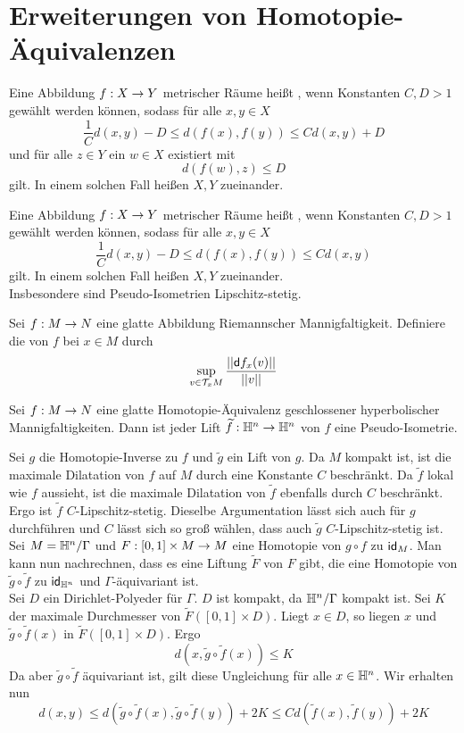 \documentclass{book}
\renewcommand{\d}{\textsf{d}}
\begin{document}
\section{Erweiterungen von Homotopie-Äquivalenzen}
\Def{}
Eine Abbildung $f : X \overset{}{\rightarrow} Y$ metrischer Räume heißt , wenn Konstanten $C,D > 1$ gewählt werden können, sodass für alle $x,y \in X$
\[ \frac{1}{C}d(x,y) - D \leq d(f(x),f(y)) \leq C d(x,y) + D \]
und für alle $z \in Y$ ein $w \in X$ existiert mit
\[ d(f(w),z) \leq D \]
gilt. In einem solchen Fall heißen $X,Y$  zueinander.

\Def{}
Eine Abbildung $f : X \overset{}{\rightarrow} Y$ metrischer Räume heißt , wenn Konstanten $C,D > 1$ gewählt werden können, sodass für alle $x,y \in X$
\[ \frac{1}{C}d(x,y) - D \leq d(f(x),f(y)) \leq C d(x,y) \]
gilt. In einem solchen Fall heißen $X,Y$  zueinander.\\
Insbesondere sind Pseudo-Isometrien Lipschitz-stetig.

\Def{}
Sei $f : M \overset{}{\rightarrow} N$ eine glatte Abbildung Riemannscher Mannigfaltigkeit. Definiere die  von $f$ bei $x\in M$ durch
\[ \sup_{v \in \T_xM} \frac{\norm{\d f_x(v)}}{\norm{v}}  \]

\Prop{}
Sei $f : M \overset{}{\rightarrow} N$ eine glatte Homotopie-Äquivalenz geschlossener hyperbolischer Mannigfaltigkeiten. Dann ist jeder Lift $\widetilde{f} : \mathbb{H}^n \overset{}{\rightarrow} \mathbb{H}^n$ von $f$ eine Pseudo-Isometrie.
\begin{Beweis}{}
	Sei $g$ die Homotopie-Inverse zu $f$ und $\widetilde{g}$ ein Lift von $g$. Da $M$ kompakt ist, ist die maximale Dilatation von $f$ auf $M$ durch eine Konstante $C$ beschränkt. Da $\widetilde{f}$ lokal wie $f$ aussieht, ist die maximale Dilatation von $\widetilde{f}$ ebenfalls durch $C$ beschränkt. Ergo ist $\widetilde{f}$ $C$-Lipschitz-stetig. Dieselbe Argumentation lässt sich auch für $g$ durchführen und $C$ lässt sich so groß wählen, dass auch $\widetilde{g}$ $C$-Lipschitz-stetig ist.\\
	Sei $M = \mathbb{H}^n / \Gamma$ und $F : [0,1] \times M \overset{}{\rightarrow} M$ eine Homotopie von $g\circ f $ zu $\textsf{id}_{M}$. Man kann nun nachrechnen, dass es eine Liftung $\widetilde{F}$ von $F$ gibt, die eine Homotopie von $\widetilde{g} \circ \widetilde{f}$ zu $\textsf{id}_{\mathbb{H}^n}$ und $\Gamma$-äquivariant ist.\\
	Sei $D$ ein Dirichlet-Polyeder für $\Gamma$. $D$ ist kompakt, da $\mathbb{H}^n / \Gamma$ kompakt ist. Sei $K$ der maximale Durchmesser von $\widetilde{F}([0,1]\times D)$. Liegt $x \in D$, so liegen $x$ und $\widetilde{g} \circ \widetilde{f}(x)$ in $\widetilde{F}([0,1]\times D)$. Ergo
	\[ d(x, \widetilde{g} \circ \widetilde{f} (x)) \leq K \]
	Da aber $\widetilde{g} \circ \widetilde{f}$ äquivariant ist, gilt diese Ungleichung für alle $x \in \mathbb{H}^n$. Wir erhalten nun
	\[ d(x,y) \leq d(\widetilde{g} \circ \widetilde{f} (x),\widetilde{g} \circ \widetilde{f}(y)) + 2K \leq C d(\widetilde{f}(x),\widetilde{f}(y)) + 2K \]
\end{Beweis}
\end{document}
